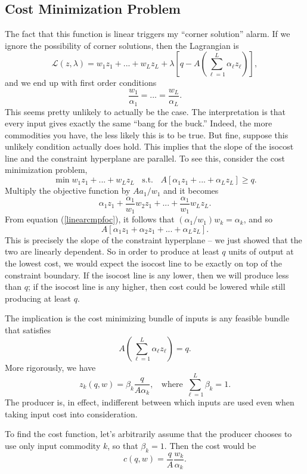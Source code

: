\documentclass[12pt]{article}
\theoremstyle{definition}
\begin{document}
\subsection{Cost Minimization Problem}
The fact that this function is linear triggers my ``corner solution'' alarm. If we ignore the possibility of corner solutions, then the Lagrangian is
	\[\mathcal{L}(z, \lambda) = w_1z_1 + ... + w_Lz_L + \lambda \left[ q - A \left(\sum_{\ell = 1}^L \alpha_{\ell} z_{\ell} \right) \right],	\]
and we end up with first order conditions
\begin{equation} \label{linearcmpfoc}
	\frac{w_1}{ \alpha_1} = ... = \frac{w_L}{ \alpha_L}.	
\end{equation}
This seems pretty unlikely to actually be the case. The interpretation is that every input gives exactly the same ``bang for the buck.''  Indeed, the more commodities you have, the less likely this is to be true. But fine, suppose this unlikely condition actually does hold. This implies that the slope of the isocost line and the constraint hyperplane are parallel. To see this, consider the cost minimization problem,
	\[ \min w_1 z_1 + ... + w_Lz_L \;\; \text{ s.t. } \;\; A[\alpha_1 z_1 + ... + \alpha_L z_L] \geq q.	\]
	Multiply the objective function by $A a_1 / w_1$ and it becomes
	\[\alpha_1 z_1 + \frac{\alpha_1}{w_1}w_2 z_1 + ... + \frac{\alpha_1}{w_1}w_Lz_L. \]
From equation (\ref{linearcmpfoc}), it follows that $(\alpha_1/w_1)w_k=\alpha_k$, and so
	\[A[\alpha_1 z_1 + \alpha_2 z_1 + ... + \alpha_L z_L]. \]
This is precisely the slope of the constraint hyperplane -- we just showed that the two are linearly dependent. So in order to produce at least $q$ units of output at the lowest cost, we would expect the isocost line to be exactly on top of the constraint boundary. If the isocost line is any lower, then we will produce less than $q$; if the isocost line is any higher, then cost could be lowered while still producing at least $q$. 
	
	The implication is the cost minimizing bundle of inputs is any feasible bundle that satisfies
	\[A \left(\sum_{\ell = 1}^L \alpha_{\ell} z_{\ell} \right)=q.\]
More rigorously, we have
	\[z_k(q,w) = \beta_k \frac{q}{A \alpha_k}, \;\; \text{ where } \sum_{\ell=1}^L \beta_k = 1. \]
The producer is, in effect, indifferent between which inputs are used even when taking input cost into consideration. 
	
	To find the cost function, let's arbitrarily assume that the producer chooses to use only input commodity $k$, so that $\beta_k=1$. Then the cost would be
	\[c(q,w)= \frac{q}{A} \frac{ w_k}{ \alpha_k}.	\]
\end{document}
